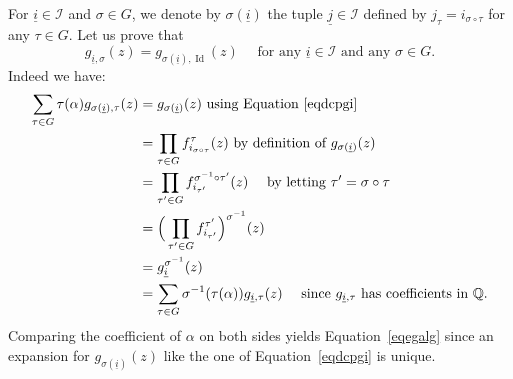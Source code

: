 \documentclass[JEP,XML,SOM,Unicode,published]{cedram}
\theoremstyle{definition}
\newcommand{\Q}{\mathbb{Q}}
\DeclareMathOperator{\Id}{Id}
\newcommand{\calI}{\mathcal I}
\newcommand{\isoul}{{\underline{i}}}
\newcommand{\jsoul}{{\underline{j}}}
\begin{document}
For $ \isoul\in\calI$ and $\sigma\in G$, we denote by $\sigma(\isoul)$ the tuple $\jsoul\in\calI$ defined by $j_\tau = i_{\sigma\circ\tau}$ for any $\tau\in G$. Let us prove that
\begin{equation} \label{eqegalg}
g_{\isoul,\sigma}(z) = g_{\sigma(\isoul),\Id}(z) \quad \mbox{ for any } \isoul\in\calI
\mbox{ and any } \sigma\in G.
\end{equation}
Indeed we have:
\begin{align*}
\sum_{\tau\in G} \tau(\alpha) g_{\sigma(\isoul),\tau}(z)
&=
g_{\sigma(\isoul)}(z) \mbox{ using Equation~\eqref{eqdcpgi}}
\\
&=
\prod_{\tau\in G} f_{i_{\sigma\circ\tau}}^\tau(z)
\mbox{ by definition of $g_{\sigma(\isoul)}(z)$}
\\
&=
\prod_{\tau'\in G} f_{i_{ \tau'}}^{\sigma^{-1}\circ \tau'}(z) \quad \mbox{ by letting }
\tau' = \sigma\circ\tau\\
&=
\Big( \prod_{\tau'\in G} f_{i_{ \tau'}}^{ \tau'}\Big)^{\sigma^{-1}}(z)\\
&= g_\isoul^{\sigma^{-1}}(z) \\
&=
\sum_{\tau\in G} \sigma^{-1}(\tau(\alpha)) g_{ \isoul ,\tau}(z)
\quad \mbox{ since $g_{ \isoul ,\tau} $ has coefficients in $\Q$.}
\end{align*}
Comparing the coefficient of $\alpha$ on both sides yields Equation~\eqref{eqegalg} since an expansion for $g_{\sigma(\isoul)}(z)$ like the one of Equation~\eqref{eqdcpgi} is unique.
\end{document}
